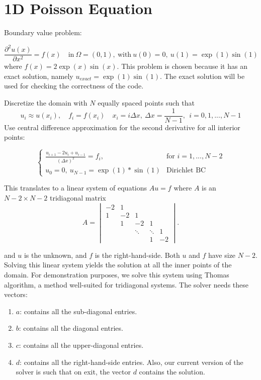 \section{1D Poisson Equation}

Boundary value problem:

\begin{equation} 
  \frac{\partial^2 u(x)}{\partial x^2} = f(x) \quad 
  \text{in} \ \Omega=(0,1), \ \text{with} 
  \ u(0)=0, \ u(1)=\exp{(1)}\sin{(1)}
\end{equation} 
where $f(x)=2\exp{(x)}\sin{(x)}$. This problem is chosen because 
it has an exact solution, namely $u_{exact} = \exp{(1)}\sin{(1)}$. 
The exact solution will be used for checking the correctness 
of the code.

Discretize the domain with $N$ equally spaced points such that 
\begin{equation}
u_i \approx u(x_i), \quad f_i=f(x_i) 
\quad x_i = i \Delta x, \ \Delta x=\frac{1}{N-1}, \ \ i=0,1,...,N-1
\end{equation}
Use central difference approximation for the second derivative 
for all interior points:
\begin{large}
\begin{equation}
\begin{cases}
  \frac{u_{i+1} - 2u_i + u_{i-1}}{(\Delta x)^2}=f_i, & \text{for } i=1,...,N-2 \\
    u_0=0, \ u_{N-1}=\exp{(1)}*\sin{(1)} & \text{Dirichlet BC}
\end{cases}  
\end{equation}
\end{large}

This translates to a linear system of equations $Au=f$ 
where $A$ is an $N-2 \times N-2$ tridiagonal matrix 
\begin{equation}
A = \begin{vmatrix}
-2 & 1 \\
1 & -2 & 1 \\
& 1 & -2 & 1 \\
& & \ddots & \ddots & 1 \\
& & & 1 & -2
\end{vmatrix}.
\end{equation}

and $u$ is the unknown, and $f$ is the right-hand-side. 
Both $u$ and $f$ have size $N-2$. 
Solving this linear system yields the solution at all the inner 
points of the domain. For demonstration purposes, we solve 
this system using Thomas algorithm, a method well-suited 
for tridiagonal systems. 
The solver needs these vectors:
\begin{enumerate}
\item $a$: contains all the sub-diagonal entries. 
\item $b$: contains all the diagonal entries. 
\item $c$: contains all the upper-diagonal entries. 
\item $d$: contains all the right-hand-side entries. 
Also, our current version of the solver is 
such that on exit, the vector $d$ contains the solution.
\end{enumerate}


